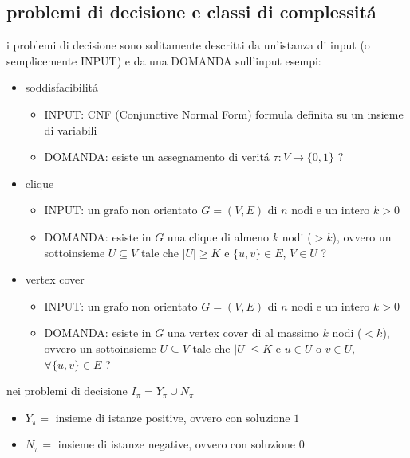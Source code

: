 \subsection*{\color{cyan} problemi di decisione e classi di complessit\'a}
\begin{flushleft}
	i problemi di decisione sono solitamente descritti da un'istanza di input (o semplicemente INPUT) e da una DOMANDA sull'input
	esempi:
	\begin{itemize}
		\item soddisfacibilit\'a
			\begin{itemize}
				\item INPUT: CNF (Conjunctive Normal Form) formula definita su un insieme di variabili
				\item DOMANDA: esiste un assegnamento di verit\'a $\tau:V\rightarrow\{0,1\}$ ?
			\end{itemize}
		\item clique
			\begin{itemize}
				\item INPUT: un grafo non orientato $G=(V,E)$ di $n$ nodi e un intero $k>0$
				\item DOMANDA: esiste in $G$ una clique di almeno $k$ nodi ($>k$), ovvero un sottoinsieme $U\subseteq V$ tale che $|U|\geq K$ e $\{u,v\}\in E$, $V\in U$ ?
			\end{itemize}
		\item vertex cover
			\begin{itemize}
				\item INPUT: un grafo non orientato $G=(V,E)$ di $n$ nodi e un intero $k>0$
				\item DOMANDA: esiste in $G$ una vertex cover di al massimo $k$ nodi ($<k$), ovvero un sottoinsieme $U\subseteq V$ tale che $|U|\leq K$ e $u\in U$ o $v\in U$, $\forall\{u,v\}\in E$ ?
			\end{itemize}
	\end{itemize}
	nei problemi di decisione $I_{\pi}=Y_{\pi}\cup N_{\pi}$
	\begin{itemize}
		\item $Y_{\pi}=$ insieme di istanze positive, ovvero con soluzione $1$
		\item $N_{\pi}=$ insieme di istanze negative, ovvero con soluzione $0$
	\end{itemize}
\end{flushleft}


